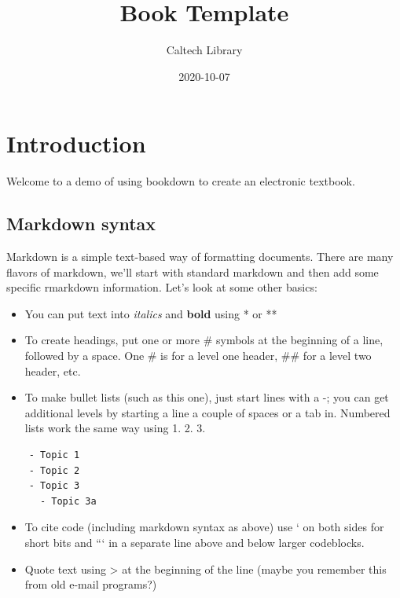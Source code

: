\documentclass[]{tufte-book}
\title{Book Template}
\author{Caltech Library}
\date{2020-10-07}
\providecommand{\tightlist}{%
  \setlength{\itemsep}{0pt}\setlength{\parskip}{0pt}}
\begin{document}
\maketitle



{
\setcounter{tocdepth}{1}
\tableofcontents
}

\chapter{Introduction}\label{introduction}

Welcome to a demo of using bookdown to create an electronic textbook.

\section{Markdown syntax}\label{markdown-syntax}

Markdown is a simple text-based way of formatting documents. There are
many flavors of markdown, we'll start with standard markdown and then
add some specific rmarkdown information. Let's look at some other
basics:

\begin{itemize}
\tightlist
\item
  You can put text into \emph{italics} and \textbf{bold} using * or **
\item
  To create headings, put one or more \# symbols at the beginning of a
  line, followed by a space. One \# is for a level one header, \#\# for
  a level two header, etc.
\item
  To make bullet lists (such as this one), just start lines with a -;
  you can get additional levels by starting a line a couple of spaces or
  a tab in. Numbered lists work the same way using 1. 2. 3.
\end{itemize}

\begin{verbatim}
    - Topic 1
    - Topic 2  
    - Topic 3
      - Topic 3a
\end{verbatim}

\begin{itemize}
\item
  To cite code (including markdown syntax as above) use ` on both sides
  for short bits and ``` in a separate line above and below larger
  codeblocks.
\item
  Quote text using \textgreater{} at the beginning of the line (maybe
  you remember this from old e-mail programs?)
\end{itemize}
\end{document}

